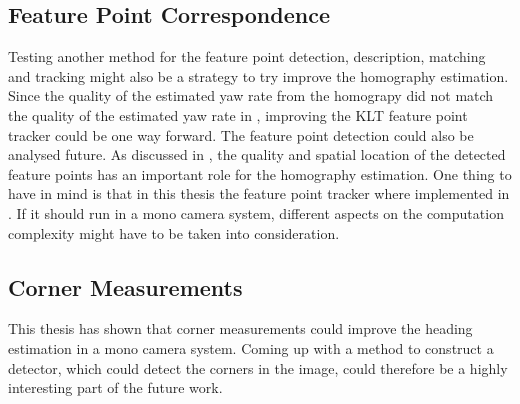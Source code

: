 \subsection{Feature Point Correspondence}
Testing another method for the feature point detection, description, matching and tracking might also be a strategy to try improve the homography estimation.
Since the quality of the estimated yaw rate from the homograpy did not match the quality of the estimated yaw rate in \cite{Gabb:2013}, improving the KLT feature point tracker could be one way forward.
The feature point detection could also be analysed future.
As discussed in , the quality and spatial location of the detected feature points has an important role for the homography estimation.
One thing to have in mind is that in this thesis the feature point tracker where implemented in \matlab.
If it should run in a mono camera system, different aspects on the computation complexity might have to be taken into consideration.

\subsection{Corner Measurements}
This thesis has shown that corner measurements could improve the heading estimation in a mono camera system.
Coming up with a method to construct a detector, which could detect the corners in the image, could therefore be a highly interesting part of the future work.